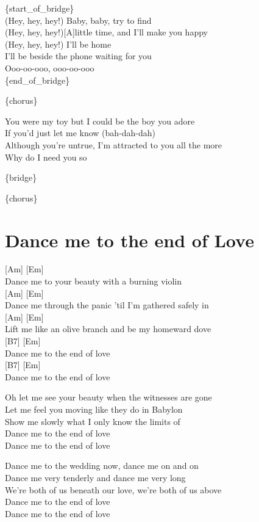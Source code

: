 \documentclass[
  letterpaper,
  DIV=11,
  numbers=noendperiod]{scrreprt}
\begin{document}
\{start\_of\_bridge\}\\
(Hey, hey, hey!) Baby, baby, try to find\\
(Hey, hey, hey!){[}A{]}little time, and I'll make you happy\\
(Hey, hey, hey!) I'll be home\\
I'll be beside the phone waiting for you\\
Ooo-oo-ooo, ooo-oo-ooo\\
\{end\_of\_bridge\}

\{chorus\}

You were my toy but I could be the boy you adore\\
If you'd just let me know (bah-dah-dah)\\
Although you're untrue, I'm attracted to you all the more\\
Why do I need you so

\{bridge\}

\{chorus\}

\hypertarget{dance-me-to-the-end-of-love}{%
\chapter{Dance me to the end of
Love}\label{dance-me-to-the-end-of-love}}

{[}Am{]} {[}Em{]}\\
Dance me to your beauty with a burning violin\\
{[}Am{]} {[}Em{]}\\
Dance me through the panic 'til I'm gathered safely in\\
{[}Am{]} {[}Em{]}\\
Lift me like an olive branch and be my homeward dove\\
{[}B7{]} {[}Em{]}\\
Dance me to the end of love\\
{[}B7{]} {[}Em{]}\\
Dance me to the end of love

Oh let me see your beauty when the witnesses are gone\\
Let me feel you moving like they do in Babylon\\
Show me slowly what I only know the limits of\\
Dance me to the end of love\\
Dance me to the end of love

Dance me to the wedding now, dance me on and on\\
Dance me very tenderly and dance me very long\\
We're both of us beneath our love, we're both of us above\\
Dance me to the end of love\\
Dance me to the end of love
\end{document}
